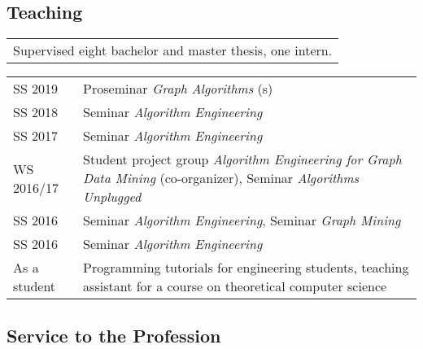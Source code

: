 \documentclass[11pt, a4paper]{scrartcl}
\begin{document}
\subsection*{Teaching}
\begin{tabular}{l}
Supervised eight bachelor and master thesis, one intern.\\
\end{tabular}

\begin{tabular}{p{3.1cm}p{12.0cm}}
SS 2019&Proseminar \emph{Graph Algorithms} (s)\\
SS 2018&Seminar \emph{Algorithm Engineering}\\
SS 2017&Seminar \emph{Algorithm Engineering}\\
WS 2016/17&Student project group \emph{Algorithm Engineering for Graph Data Mining} (co-organizer), Seminar \emph{Algorithms Unplugged}\\
SS 2016& Seminar \emph{Algorithm Engineering}, Seminar \emph{Graph Mining}\\
SS 2016&Seminar \emph{Algorithm Engineering}\\
As a student&Programming tutorials for engineering students, teaching assistant for a course on theoretical computer science\\
\end{tabular}

\subsection*{Service to the Profession}
\end{document}
